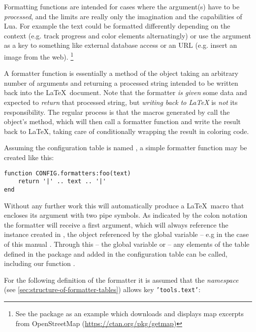 \documentclass{scrartcl}
\begin{document}
Formatting functions are intended for cases where the argument(s) have to be
\emph{processed}, and the limits are really only the imagination and the
capabilities of Lua.  For example the text could be formatted differently
depending on the context (e.g. track progress and color elements alternatingly)
or use the argument as a key to something like external database access or an
URL (e.g. insert an image from the web).%
\footnote{See the  package as an example which downloads and
displays map excerpts from OpenStreetMap (\url{https://ctan.org/pkg/getmap})}

\medskip

A formatter function is essentially a method of the  object
taking an arbitrary number of arguments and returning a processed string
intended to be written back into the \LaTeX\ document.  Note that the formatter
\emph{is given} some data and expected to \emph{return} that processed string,
but \emph{writing back to \LaTeX} is \emph{not} its responsibility.  The regular
process is that the macros generated by  call the object's
 method, which will then call a formatter function and write the
result back to \LaTeX, taking care of conditionally wrapping the result in
coloring code.

Assuming the configuration table is named , a simple formatter
function may be created like this:

\begin{verbatim}
function CONFIG.formatters:foo(text)
    return '|' .. text .. '|'
end
\end{verbatim}

\noindent Without any further work this will automatically produce a \LaTeX\
macro \texttt{} that encloses its argument with two pipe
symbols.  As indicated by the colon notation the formatter will receive a first
\luavar{self} argument, which will always reference the \luavar{Templates}
instance created in \texttt{\setupLuaTemplates}, the object referenced
by the global variable -- e.g in the case of this manual
.  Through this -- the global variable or
\luavar{self} -- any elements of the \luavar{Templates} table defined in the
package and added in the configuration table can be called, including our function
\luavar{foo()}.

For the following definition of the formatter  it is assumed that
the \emph{namespace} (see \vref{sec:structure-of-formatter-tables}) allows key
\texttt{'tools.text'}:
\end{document}
